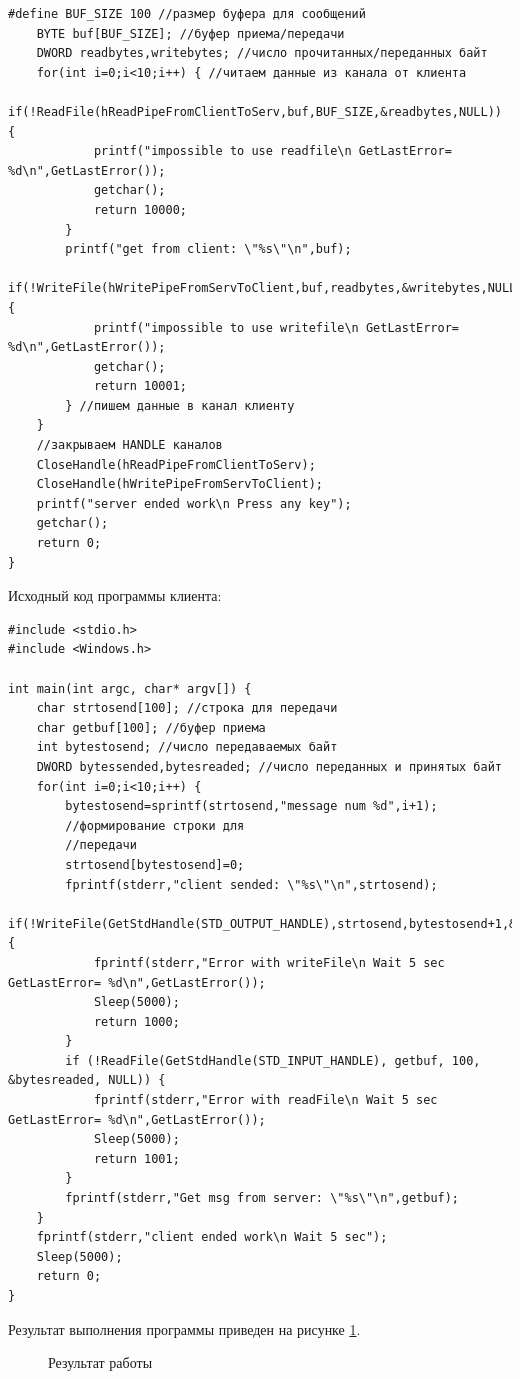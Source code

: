 \documentclass[a4paper]{article}
\begin{document}
\begin{lstlisting}[style=crs_cpp]
#define BUF_SIZE 100 //размер буфера для сообщений 
	BYTE buf[BUF_SIZE]; //буфер приема/передачи 
	DWORD readbytes,writebytes; //число прочитанных/переданных байт
	for(int i=0;i<10;i++) { //читаем данные из канала от клиента 
		if(!ReadFile(hReadPipeFromClientToServ,buf,BUF_SIZE,&readbytes,NULL)) { 
			printf("impossible to use readfile\n GetLastError= %d\n",GetLastError());
			getchar(); 
			return 10000;
		} 
		printf("get from client: \"%s\"\n",buf); 
		if(!WriteFile(hWritePipeFromServToClient,buf,readbytes,&writebytes,NULL)) { 
			printf("impossible to use writefile\n GetLastError= %d\n",GetLastError()); 
			getchar(); 
			return 10001; 
		} //пишем данные в канал клиенту
	} 
	//закрываем HANDLE каналов 
	CloseHandle(hReadPipeFromClientToServ);
	CloseHandle(hWritePipeFromServToClient); 
	printf("server ended work\n Press any key");
	getchar();
	return 0; 
}
	\end{lstlisting}
	
	
	Исходный код программы клиента:
	\begin{lstlisting}[style=crs_cpp]
#include <stdio.h> 
#include <Windows.h> 

int main(int argc, char* argv[]) { 
	char strtosend[100]; //строка для передачи 
	char getbuf[100]; //буфер приема 
	int bytestosend; //число передаваемых байт 
	DWORD bytessended,bytesreaded; //число переданных и принятых байт 
	for(int i=0;i<10;i++) { 
		bytestosend=sprintf(strtosend,"message num %d",i+1); 
		//формирование строки для 
		//передачи 
		strtosend[bytestosend]=0; 
		fprintf(stderr,"client sended: \"%s\"\n",strtosend); 
		if(!WriteFile(GetStdHandle(STD_OUTPUT_HANDLE),strtosend,bytestosend+1,&bytesreaded,NULL)) { 
			fprintf(stderr,"Error with writeFile\n Wait 5 sec GetLastError= %d\n",GetLastError());
			Sleep(5000); 
			return 1000;
		} 
		if (!ReadFile(GetStdHandle(STD_INPUT_HANDLE), getbuf, 100, &bytesreaded, NULL)) { 
			fprintf(stderr,"Error with readFile\n Wait 5 sec GetLastError= %d\n",GetLastError());
			Sleep(5000); 
			return 1001; 
		} 
		fprintf(stderr,"Get msg from server: \"%s\"\n",getbuf); 
	} 
	fprintf(stderr,"client ended work\n Wait 5 sec"); 
	Sleep(5000); 
	return 0; 
}
	\end{lstlisting}
	
	Результат выполнения программы приведен на рисунке \ref{img:task2}.
	\begin{figure}[h!]
		\caption{Результат работы}
		\label{img:task2}
	\end{figure}
	
\end{document}
